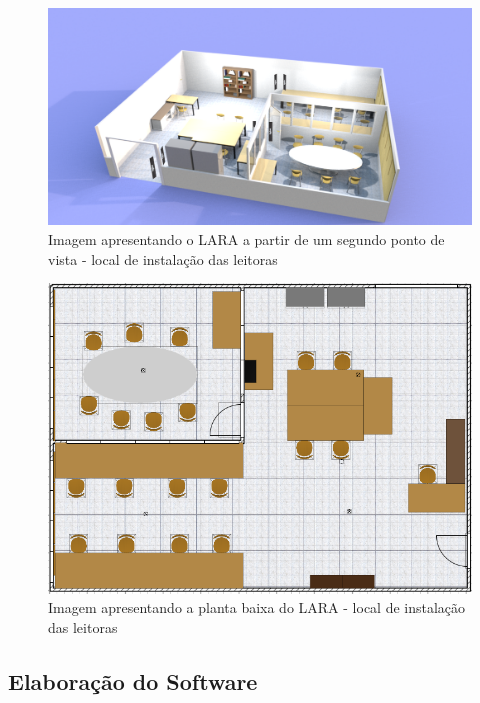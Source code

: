   \begin{figure}[H]
    \centering
    \includegraphics[width=1\linewidth]{figs/Metodologia/LARA_leitoras-2.png}
    \caption{Imagem apresentando o LARA a partir de um segundo ponto de vista - local de instalação das leitoras}
    \label{fig:LARA2}
\end{figure}

  \begin{figure}[H]
    \centering
    \includegraphics[width=0.7\linewidth]{figs/Metodologia/LARA_planta.PNG}
    \caption{Imagem apresentando a planta baixa do LARA - local de instalação das leitoras}
    \label{fig:LARA_planta}
\end{figure}



 
 \subsection{Elaboração do Software}
 

 
 

